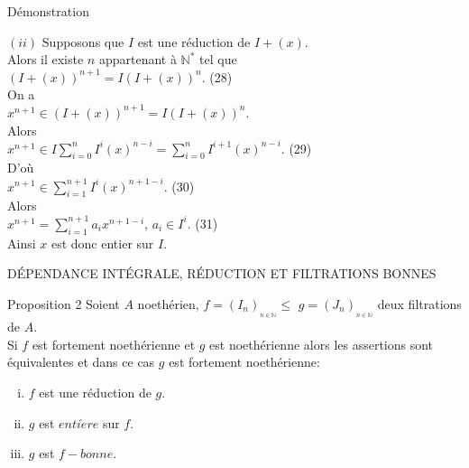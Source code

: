 \documentclass[11pt,a4paper]{beamer}
\begin{document}
	
					\begin{frame}{Démonstration}
		\begin{block}{}
				$(ii)$ Supposons que $I$ est une réduction de $I + (x)$.\\
			Alors il existe $ n $ appartenant à $ \mathbb{N^*}$ tel que \\ $(I + (x))^{n+1} = I(I + (x))^{n}$. (28)\\
			On a \\ $x^{n+1} \in (I + (x))^{n+1} = I(I + (x))^{n}$. \\Alors \\ $x^{n+1} \in I\displaystyle \sum_{i=0}^{n}{I^i (x)^{n-i}} = \displaystyle \sum_{i=0}^{n}{I^{i+1} (x)^{n-i}}$. (29)\\
			D'où \\$x^{n+1} \in \displaystyle \sum_{i=1}^{n+1}{I^i (x)^{n+1-i}}$. (30)\\ Alors \\$ x^{n+1} =  \displaystyle \sum_{i=1}^{n+1}{a_i x^{n+1-i}}$,  $a_i \in I^i$. (31)\\ Ainsi $x$ est donc entier sur $I$.
		\end{block}
	\end{frame}
	
	
	
	
	\begin{frame}{DÉPENDANCE INTÉGRALE, RÉDUCTION ET FILTRATIONS BONNES}
		\begin{block}{Proposition 2}
			Soient $A$ noethérien, $f=(I_{n})_{_{n\in \mathbb{N}}}\leq $ $g=(J_{n})_{_{n\in \mathbb{N}}}$ deux filtrations de $A.$ \\ Si $f$ est fortement noethérienne et $g$ est noethérienne alors les assertions sont équivalentes et dans ce cas $g$ est fortement noethérienne:
			\begin{enumerate}[(i)]
				\item $f$ est une réduction de $g.$
				\item $g$ est $enti\grave{e}re$ sur $f.$
				\item $g$ est $f-bonne.$
			\end{enumerate}
		\end{block}
	\end{frame}
	
\end{document}
